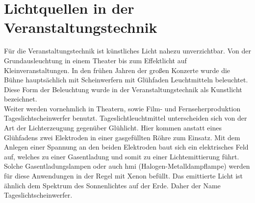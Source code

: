 \documentclass[11pt]{scrartcl}
\begin{document}
\section{Lichtquellen in der Veranstaltungstechnik}
Für die Veranstaltungstechnik ist künstliches Licht nahezu unverzichtbar. Von der Grundausleuchtung in einem Theater bis zum Effektlicht
auf Kleinveranstaltungen. In den frühen Jahren der großen Konzerte wurde die Bühne hauptsächlich mit Scheinwerfern mit Glühfaden Leuchtmitteln beleuchtet.
Diese Form der Beleuchtung wurde in der Veranstaltungstechnik als Kunstlicht bezeichnet.\\
Weiter werden vornehmlich in Theatern, sowie Film- und Fernseherproduktion Tageslichtscheinwerfer benutzt. Tageslichtleuchtmittel
unterscheiden sich von der Art der Lichterzeugung gegenüber Glühlicht. Hier kommen anstatt eines Glühfadens zwei Elektroden in einer
gasgefüllten Röhre zum Einsatz. Mit dem Anlegen einer Spannung an den beiden Elektroden baut sich ein elektrisches Feld auf, welches zu
einer Gasentladung und somit zu einer Lichtemittierung führt. Solche Gasentladungslampen oder auch \ac{hmi} (Halogen-Metalldampflampe)
werden für diese Anwendungen in der Regel mit Xenon befüllt. Das emittierte Licht ist ähnlich dem Spektrum des Sonnenlichtes auf der
Erde. Daher der Name Tageslichtscheinwerfer.
\end{document}
